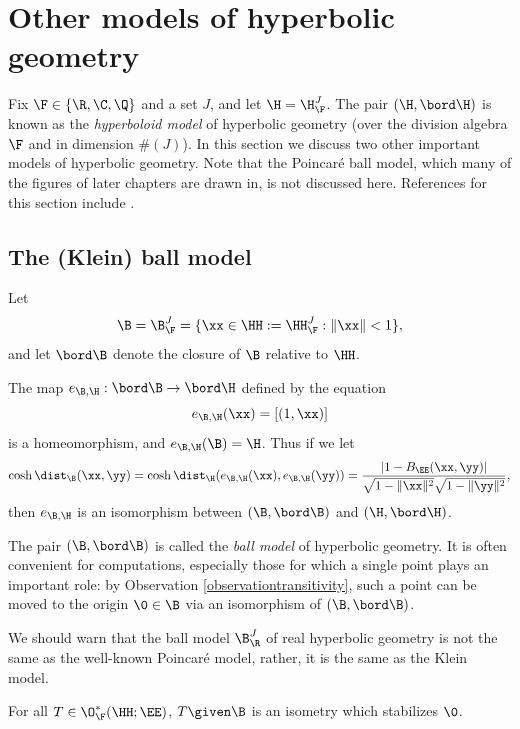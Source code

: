 \bigskip
\section{Other models of hyperbolic geometry}
\label{subsectionmodels}

Fix $\F\in\{\R,\C,\Q\}$ and a set $J$, and let $\H = \H_\F^J$. The pair $(\H,\bord\H)$ is known as the \emph{hyperboloid model} of hyperbolic geometry (over the division algebra $\F$ and in dimension $\#(J)$). In this section we discuss two other important models of hyperbolic geometry. Note that the Poincar\'e ball model, which many of the figures of later chapters are drawn in, is not discussed here. References for this section include \cite{CFKP, Goldman}.

\subsection{The (Klein) ball model}
\label{subsubsectionballmodel}
Let
\[
\B = \B_\F^J = \{\xx\in \HH := \HH_\F^J : \|\xx\| < 1\},
\]
and let $\bord\B$ denote the closure of $\B$ relative to $\HH$.
\begin{observation}
\label{observationHequivB}
The map $e_{\B,\H}:\bord\B\to\bord\H$ defined by the equation
\[
e_{\B,\H}(\xx) = [(1,\xx)]
\]
is a homeomorphism, and $e_{\B,\H}(\B) = \H$. Thus if we let
\begin{equation}
\label{distB}
\cosh\dist_\B(\xx,\yy) = \cosh\dist_\H(e_{\B,\H}(\xx),e_{\B,\H}(\yy)) = \frac{|1 - B_\EE(\xx,\yy)|}{\sqrt{1 - \|\xx\|^2}\sqrt{1 - \|\yy\|^2}},
\end{equation}
then $e_{\B,\H}$ is an isomorphism between $(\B,\bord\B)$ and $(\H,\bord\H)$.
\end{observation}
The pair $(\B,\bord\B)$ is called the \emph{ball model} of hyperbolic geometry. It is often convenient for computations, especially those for which a single point plays an important role: by Observation \ref{observationtransitivity}, such a point can be moved to the origin $\0\in\B$ via an isomorphism of $(\B,\bord\B)$.

\begin{remark}
We should warn that the ball model $\B_\R^J$ of real hyperbolic geometry is not the same as the well-known Poincar\'e model, rather, it is the same as the Klein model.
\end{remark}

\begin{observation}
For all $T\in \O_\F^*(\HH;\EE)$, $T\given\B$ is an isometry which stabilizes $\0$.
\end{observation}

